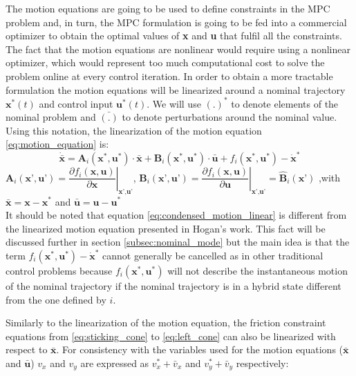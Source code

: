\documentclass[12,twoside]{TFG-GM}
\theoremstyle{definition}
\theoremstyle{remark}
\newcommand*\diff[1]{\bar{#1}}
\begin{document}
The motion equations are going to be used to define constraints in the MPC problem and, in turn, the MPC formulation is going to be fed into a commercial optimizer to obtain the optimal values of \textbf{x} and \textbf{u} that fulfil all the constraints. The fact that the motion equations are nonlinear would require using a nonlinear optimizer, which would represent too much computational cost to solve the problem online at every control iteration. In order to obtain a more tractable formulation the motion equations will be linearized around a nominal trajectory $\textbf{x}^*(t)$ and control input $\textbf{u}^*(t)$. We will use $(.)^*$ to denote elements of the nominal problem and $\diff{(.)}$ to denote perturbations around the nominal value. Using this notation, the linearization of the motion equation \ref{eq:motion_equation} is:
\begin{equation} \label{eq:condensed_motion_linear}
\dot{\diff{\textbf{x}}} = \textbf{A}_i(\textbf{x}^*, \textbf{u}^*)\cdot \diff{\textbf{x}} + \textbf{B}_i(\textbf{x}^*, \textbf{u}^*)\cdot \diff{\textbf{u}} + f_i(\textbf{x}^*, \textbf{u}^*) - \dot{\textbf{x}}^*
\end{equation}
$\textbf{A}_i(\textbf{x'}, \textbf{u'}) = \left.\dfrac{\partial f_i(\textbf{x}, \textbf{u})}{\partial \textbf{x}}\right|_{\textbf{x'}, \textbf{u'}}$, $\textbf{B}_i(\textbf{x'}, \textbf{u'}) = \left.\dfrac{\partial f_i(\textbf{x}, \textbf{u})}{\partial \textbf{u}}\right|_{\textbf{x'}, \textbf{u'}} = \hat{\textbf{B}}_i(\textbf{x'})$
,with $\diff{\textbf{x}} = \textbf{x} - \textbf{x}^*$ and $\diff{\textbf{u}} = \textbf{u} - \textbf{u}^*$ \\

It should be noted that equation \ref{eq:condensed_motion_linear} is different from the linearized motion equation presented in Hogan's work. This fact will be discussed further in section \ref{subsec:nominal_mode} but the main idea is that the term $f_i(\textbf{x}^*, \textbf{u}^*) - \dot{\textbf{x}}^*$ cannot generally be cancelled as in other traditional control problems because $f_i(\textbf{x}^*, \textbf{u}^*)$ will not describe the instantaneous motion of the nominal trajectory if the nominal trajectory is in a hybrid state different from the one defined by $i$.

Similarly to the linearization of the motion equation, the friction constraint equations from \ref{eq:sticking_cone} to \ref{eq:left_cone} can also be linearized with respect to $\diff{\textbf{x}}$. For consistency with the variables used for the motion equations ($\diff{\textbf{x}}$ and $\diff{\textbf{u}}$) $v_x$ and $v_y$ are expressed as $v_x^* + \diff{v}_x$ and $v_y^* + \diff{v}_y$ respectively:
\end{document}
